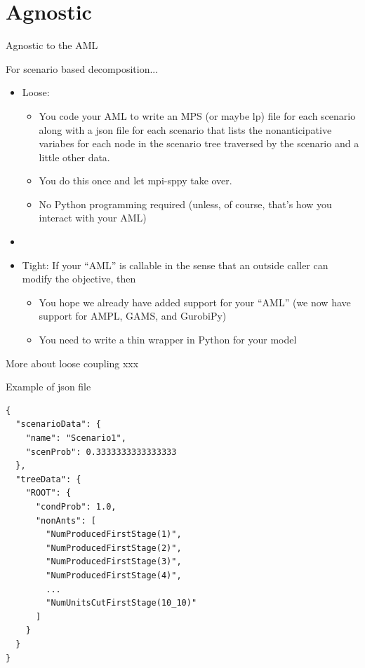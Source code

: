 \documentclass[9pt,usenames,dvipsnames]{beamer}
\begin{document}
\section{Agnostic}
\begin{frame}{Agnostic to the AML}
  \subtitle{(or, really, ecumenical)}
  For scenario based decomposition...
  \begin{itemize}
  \item Loose:
    \begin{itemize}
    \item You code your AML to write an MPS (or maybe lp) file for each scenario along with a json file for each scenario that lists the nonanticipative variabes for each node in the scenario tree traversed by the scenario and a little other data.
    \item You do this once and let mpi-sppy take over.
      \item No Python programming required (unless, of course, that's how you interact with your AML)
      \end{itemize}
    \item[]
    \item Tight: If your ``AML'' is callable in the sense that an outside caller
      can modify the objective, then
      \begin{itemize}
      \item You hope we already have added support for your ``AML'' (we now have support for AMPL, GAMS, and GurobiPy)
        \item You need to write a thin wrapper in Python for your model
        \end{itemize}
  \end{itemize}
\end{frame}

\begin{frame}{More about loose coupling}
xxx
\end{frame}

\begin{frame}{Example of json file}
\begin{verbatim}
{
  "scenarioData": {
    "name": "Scenario1",
    "scenProb": 0.3333333333333333
  },
  "treeData": {
    "ROOT": {
      "condProb": 1.0,
      "nonAnts": [
        "NumProducedFirstStage(1)",
        "NumProducedFirstStage(2)",
        "NumProducedFirstStage(3)",
        "NumProducedFirstStage(4)",
        ...
        "NumUnitsCutFirstStage(10_10)"
      ]
    }
  }
}  
\end{verbatim}
  \end{frame}
\end{document}
